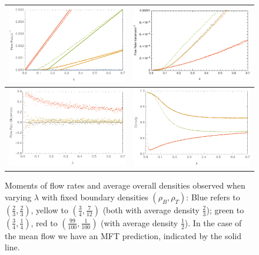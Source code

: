 \begin{figure}[h!]
\vspace{1em}
\caption{\label{fig:lambdaScans} Moments of flow rates and average overall densities observed when varying $\lambda$ with fixed boundary densities $(\rho_B, \rho_T)$: Blue refers to $(\frac{2}{3}, \frac{2}{3})$, yellow to $(\frac{3}{4}, \frac{7}{12})$
(both with average density $\frac{2}{3}$); green to $(\frac{3}{4}, \frac{1}{4})$, red to $(\frac{99}{100}, \frac{1}{100})$ (with average density $\frac{1}{2}$). In the case of the mean flow we have an MFT prediction, indicated by the solid line.}
\begin{center}
 \begin{tabular}{c|c}
    \includegraphics[width=0.5\linewidth]{../tex-src/images/lambdaScan/flowMean} & \includegraphics[width=0.5\linewidth]{../tex-src/images/lambdaScan/flowVar} \\
    \hline
    \includegraphics[width=0.5\linewidth]{../tex-src/images/lambdaScan/flowSkew} & \includegraphics[width=0.5\linewidth]{../tex-src/images/lambdaScan/lambdaDens} \\
    \end{tabular}
\end{center}
    \vspace{-0em}
\end{figure}


